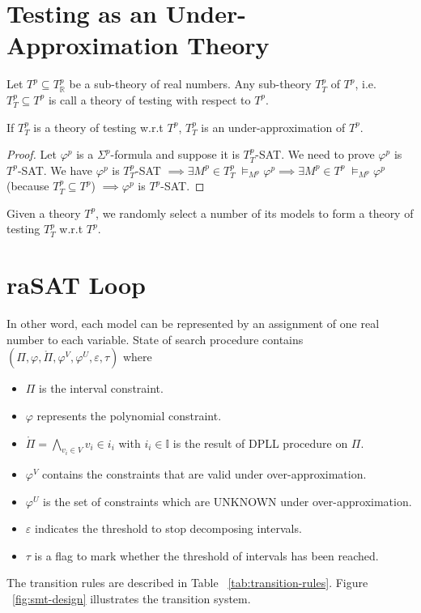 \section{Testing as an Under-Approximation Theory}
\begin{definition}
Let $T^p \subseteq T^p_\mathbb{R}$ be a sub-theory of real numbers. Any sub-theory $T^p_T$ of $T^p$, i.e. $T^p_T \subseteq T^p$ is call a theory of testing with respect to $T^p$.
\end{definition}

\begin{theorem}
If $T^p_T$ is a theory of testing w.r.t $T^p$, $T^p_T$ is an under-approximation of $T^p$.
\end{theorem}

\begin{proof}
Let $\varphi^p$ is a $\Sigma^p$-formula and suppose it is $T^p_T$-SAT. We need to prove $\varphi^p$ is $T^p$-SAT. We have $\varphi^p$ is $T^p_T$-SAT $\implies \exists M^p \in T^p_T \; \models_{M^p} \varphi^p \implies \exists M^p \in T^p \; \models_{M^p} \varphi^p$ {(because $T^p_T \subseteq T^p$)} $\implies \varphi^p$ is $T^p$-SAT.
\end{proof}

Given a theory $T^p$, we randomly select a number of its models to form a theory of testing $T^p_T$ w.r.t $T^p$.

\section{raSAT Loop}
In other word, each model can be represented by an assignment of one real number to each variable. 
State of search procedure contains  $(\Pi, \varphi, \mathring{\Pi}, \varphi^V, \varphi^U, \varepsilon, \tau)$ where 
\begin{itemize}
\item $\Pi$ is the interval constraint.
\item $\varphi$ represents the polynomial constraint.
\item $\mathring{\Pi} = \bigwedge\limits_{v_i \in V} v_i \in i_i$ with $i_i \in \mathbb{I}$ is the result of DPLL procedure on $\Pi$.
\item $\varphi^V$ contains the constraints that are valid under over-approximation.
\item $\varphi^U$ is the set of constraints which are UNKNOWN under over-approximation.
\item $\varepsilon$ indicates the threshold to stop decomposing intervals.
\item $\tau$ is a flag to mark whether the threshold of intervals has been reached.
\end{itemize}
The transition rules are described in Table ~\ref{tab:transition-rules}. Figure ~\ref{fig:smt-design} illustrates the transition system. 

